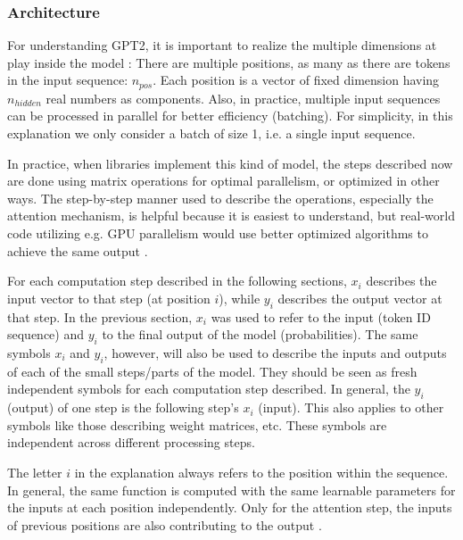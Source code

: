 \subsubsection{Architecture}


For understanding GPT2, it is important to realize the multiple dimensions at play inside the model \cite{alammar-gpt2} :
There are multiple positions, as many as there are tokens in the input sequence: $n_{pos}$.
Each position is a vector of fixed dimension having $n_{hidden}$ real numbers as components.
Also, in practice, multiple input sequences can be processed in parallel for better efficiency (batching).
For simplicity, in this explanation we only consider a batch of size 1, i.e. a single input sequence.

In practice, when libraries implement this kind of model, the steps described now are done using matrix operations
for optimal parallelism, or optimized in other ways. The step-by-step manner used to describe the operations,
especially the attention mechanism, is helpful because it is easiest to understand, but real-world code
utilizing e.g. GPU parallelism would use better optimized algorithms to achieve the same output \cite{choi2023unleashing} . 

For each computation step described in the following sections, $x_i$ describes the input vector to that step (at position $i$), while $y_i$ describes the output vector
at that step. In the previous section, $x_i$ was used to refer to the input (token ID sequence) and $y_i$ to the final output of the model (probabilities).
The same symbols $x_i$ and $y_i$, however, will also be used to describe the inputs and outputs of each of the small steps/parts of the model.
They should be seen as fresh independent symbols for each computation step described. In general, the $y_i$ (output) of one step is the following step's $x_i$ (input).
This also applies to other symbols like those describing weight matrices, etc. These symbols are independent across different processing steps.

The letter $i$ in the explanation always refers to the position within the sequence. In general, the same function is computed with the same learnable parameters
for the inputs at each position independently. Only for the attention step, the inputs of previous positions are also contributing to the output \cite{alammar-gpt2}.

